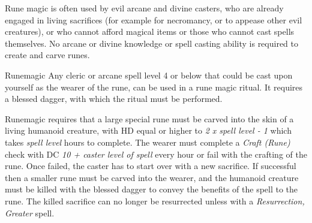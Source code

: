 Rune magic is often used by evil arcane and divine casters, who are already
engaged in living sacrifices (for example for necromancy, or to appease other
evil creatures), or who cannot afford magical items or those who cannot cast
spells themselves. No arcane or divine knowledge or spell casting ability is
required to create and carve runes.

\begin{35e}{Runemagic}
  Any cleric or arcane spell level 4 or below that could be cast upon yourself
  as the wearer of the rune, can be used in a rune magic ritual. It requires a
  blessed dagger, with which the ritual  must
  be performed.

  Runemagic requires that a large special rune must be carved into the skin of
  a living humanoid creature, with HD equal or higher to \emph{2 x spell level
    - 1} which takes \emph{spell level} hours to complete. The wearer must
  complete a \emph{Craft (Rune)} check with DC \emph{10 + caster level of
    spell} every hour or fail with the crafting of the rune. Once failed, the
  caster has to start over with a new sacrifice. If successful then a smaller
  rune must be carved into the wearer, and the humanoid creature must be
  killed with the blessed dagger to convey the benefits of the spell to the
  rune. The killed sacrifice can no longer be resurrected unless with a
  \emph{Resurrection, Greater} spell.
\end{35e}
